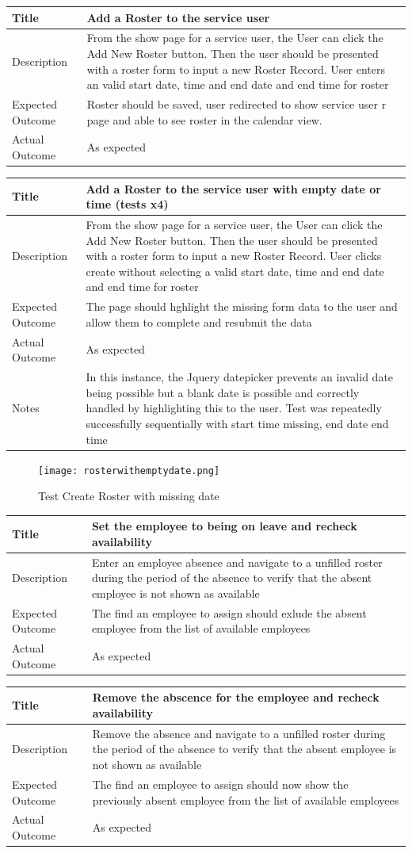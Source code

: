 \documentclass[a4paper,12pt]{article}
\newcommand\addrow[2]{#1 &#2\\ }
\newcommand\addheading[2]{#1 &#2\\ \hline}
\newcommand\tabularhead{\begin{tabular}{lp{11cm}}
\hline
}
\newenvironment{usecase}{\tabularhead}
{\hline\end{tabular}}
\begin{document}
\begin{usecase}
    \addheading{Title}{Add a Roster to the service user}
  \addheading{Description}{From the show page for a service user, the User  can click the Add New Roster button. Then the user should be presented with a roster form to input a new Roster Record. User enters an valid start date, time and end date and end time for roster}
  \addrow{Expected Outcome}{Roster should be saved, user redirected to show service user r page and able to see roster in the calendar view.}
  \addrow{Actual Outcome}{As expected}
\end{usecase}

\begin{usecase}
    \addheading{Title}{Add a Roster to the service user with empty date or time (tests x4)}
  \addheading{Description}{From the show page for a service user, the User  can click the Add New Roster button. Then the user should be presented with a roster form to input a new Roster Record. User clicks create without selecting a valid start date, time and end date and end time for roster}
  \addrow{Expected Outcome}{The page should hghlight the missing form data to the user and allow them to complete and resubmit the data}
  \addrow{Actual Outcome}{As expected}
  \addrow{Notes}{In this instance, the Jquery datepicker prevents an invalid date being possible but a blank date is possible and correctly handled by highlighting this to the user. Test was repeatedly successfully sequentially with start time missing, end date end time}
\end{usecase}

 \begin{figure}[h!]
\texttt{[image: rosterwithemptydate.png]}
  \caption{Test Create Roster with missing date }
  \label{fig:Test Create Roster with missing date }
\end{figure}

\begin{usecase}
    \addheading{Title}{Set the employee to being on leave and recheck availability}
  \addheading{Description}{Enter an employee absence and navigate to a unfilled roster during the period of the absence to verify that the absent employee is not shown as available}
  \addrow{Expected Outcome}{The find an employee to assign should exlude the absent employee from the list of available employees}
  \addrow{Actual Outcome}{As expected}
\end{usecase}

\begin{usecase}
    \addheading{Title}{Remove the abscence for the employee and recheck availability}
  \addheading{Description}{Remove the absence and navigate to a unfilled roster during the period of the absence to verify that the absent employee is not shown as available}
  \addrow{Expected Outcome}{The find an employee to assign should now show the previously absent employee from the list of available employees}
  \addrow{Actual Outcome}{As expected}
\end{usecase}
\end{document}
